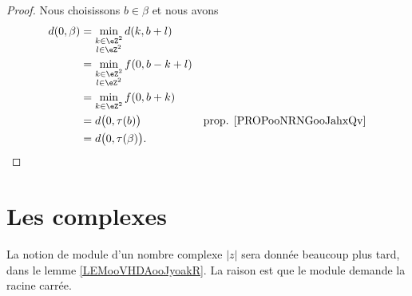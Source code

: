 \begin{proof}
	Nous choisissons \( b\in \beta\) et nous avons
	\begin{subequations}
		\begin{align}
			d(0,\beta) & =\min_{\substack{ k\in \eZ^2                                         \\ l\in \eZ^2 }  }d(k,b+l)\\
			           & =\min_{\substack{ k\in \eZ^2                                         \\ l\in \eZ^2 }  }f(0,b-k+l)\\
			           & =\min_{k\in\eZ^2}f(0,b+k)                                            \\
			           & =d\big( 0,\tau(b) \big)      & \text{prop. \ref{PROPooNRNGooJahxQv}} \\
			           & =d\big( 0,\tau(\beta) \big).
		\end{align}
	\end{subequations}
\end{proof}



\section{Les complexes}

La notion de module d'un nombre complexe \( | z |\) sera donnée beaucoup plus tard, dans le lemme \ref{LEMooVHDAooJyoakR}. La raison est que le module demande la racine carrée.

